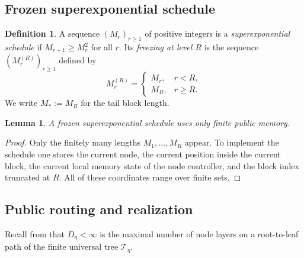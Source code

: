 \documentclass[12pt]{article}
\newtheorem{lemma}[theorem]{Lemma}
\theoremstyle{definition}
\newtheorem{definition}[theorem]{Definition}
\newcommand{\1}{\mathbf{1}}
\newcommand{\cT}{\mathcal{T}}
\begin{document}
\subsection{Frozen superexponential schedule}


\begin{definition}
A sequence $(M_r)_{r\ge 1}$ of positive integers is a
\emph{superexponential schedule} if $M_{r+1}\ge M_r^2$ for all $r$. Its
\emph{freezing at level $R$} is the sequence $(M_r^{(R)})_{r\ge 1}$ defined by
\[
M_r^{(R)}=
\begin{cases}
M_r, & r<R,\\
M_R, & r\ge R.
\end{cases}
\]
We write $M_*:=M_R$ for the tail block length.
\end{definition}

\begin{lemma}
\label{lem:frozen-memory}
A frozen superexponential schedule uses only finite public memory.
\end{lemma}

\begin{proof}
Only the finitely many lengths $M_1,\dots,M_R$ appear. To implement the schedule
one stores the current node, the current position inside the current block, the
current local memory state of the node controller, and the block index truncated at
$R$. All of these coordinates range over finite sets.
\end{proof}


\subsection{Public routing and realization}

Recall from  that $D_\eta<\infty$ is the maximal number of
node layers on a root-to-leaf path of the finite universal tree $\cT_\eta$.
\end{document}
